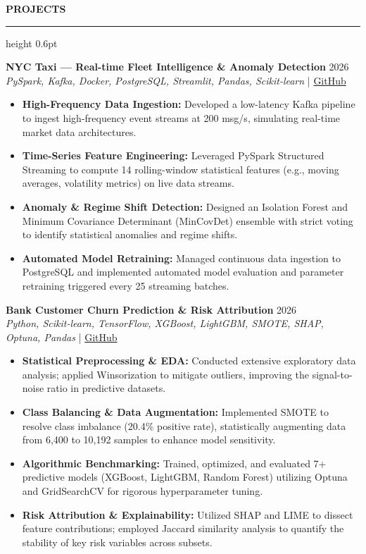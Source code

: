 ﻿\documentclass{resume}
\renewcommand{\sectionskip}{\vspace{5pt}}
\renewcommand{\sectionlineskip}{\vspace{3pt}}
\renewenvironment{rSection}[1]{
  \sectionskip
  {\color{headerblue}\textbf{\MakeUppercase{#1}}}
  \sectionlineskip
  {\color{rulegray}\hrule height 0.6pt}
  \vspace{0pt}
  \begin{list}{}{
    \setlength{\leftmargin}{0em}
    \setlength{\topsep}{0pt}
    \setlength{\partopsep}{0pt}
    \setlength{\parsep}{0pt}
    \setlength{\itemsep}{0pt}
  }
  \item[]
}{
  \end{list}
}
\begin{document}
\begin{rSection}{Projects}
    \item \textbf{NYC Taxi — Real-time Fleet Intelligence \& Anomaly Detection} \hfill 2026\\
    {\small \textit{PySpark, Kafka, Docker, PostgreSQL, Streamlit, Pandas, Scikit-learn}} \hfill | \href{https://github.com/vietpham10205/real-time-Fleet-Intelligence-anomaly-detection-dashboard}{GitHub}
    {\small
    \begin{itemize}[itemsep=4pt, parsep=0pt, leftmargin=1.2em]
        \item \textbf{High-Frequency Data Ingestion:} Developed a low-latency Kafka pipeline to ingest high-frequency event streams at 200 msg/s, simulating real-time market data architectures.
        \item \textbf{Time-Series Feature Engineering:} Leveraged PySpark Structured Streaming to compute 14 rolling-window statistical features (e.g., moving averages, volatility metrics) on live data streams.
        \item \textbf{Anomaly \& Regime Shift Detection:} Designed an Isolation Forest and Minimum Covariance Determinant (MinCovDet) ensemble with strict voting to identify statistical anomalies and regime shifts.
        \item \textbf{Automated Model Retraining:} Managed continuous data ingestion to PostgreSQL and implemented automated model evaluation and parameter retraining triggered every 25 streaming batches.
    \end{itemize}
    }
    \vspace{15pt}

    \item \textbf{Bank Customer Churn Prediction \& Risk Attribution} \hfill 2026\\
    {\small \textit{Python, Scikit-learn, TensorFlow, XGBoost, LightGBM, SMOTE, SHAP, Optuna, Pandas}} \hfill | \href{https://github.com/ThanhThang5722/Bank-Customer-Churn-Prediction}{GitHub}
    {\small
    \begin{itemize}[itemsep=4pt, parsep=0pt, leftmargin=1.2em]
        \item \textbf{Statistical Preprocessing \& EDA:} Conducted extensive exploratory data analysis; applied Winsorization to mitigate outliers, improving the signal-to-noise ratio in predictive datasets.
        \item \textbf{Class Balancing \& Data Augmentation:} Implemented SMOTE to resolve class imbalance (20.4\% positive rate), statistically augmenting data from 6,400 to 10,192 samples to enhance model sensitivity.
        \item \textbf{Algorithmic Benchmarking:} Trained, optimized, and evaluated 7+ predictive models (XGBoost, LightGBM, Random Forest) utilizing Optuna and GridSearchCV for rigorous hyperparameter tuning.
        \item \textbf{Risk Attribution \& Explainability:} Utilized SHAP and LIME to dissect feature contributions; employed Jaccard similarity analysis to quantify the stability of key risk variables across subsets.
    \end{itemize}
    }
\end{rSection}
\end{document}
